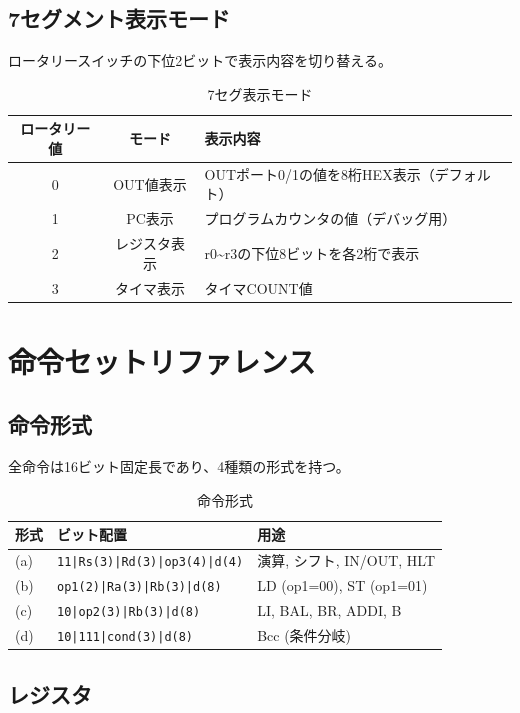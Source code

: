 \documentclass[a4paper,11pt]{ltjsarticle}
\begin{document}
\subsection{7セグメント表示モード}

ロータリースイッチの下位2ビットで表示内容を切り替える。

\begin{table}[h]
\centering
\caption{7セグ表示モード}
\begin{tabular}{ccl}
\toprule
ロータリー値 & モード & 表示内容 \\
\midrule
0 & OUT値表示 & OUTポート0/1の値を8桁HEX表示（デフォルト） \\
1 & PC表示   & プログラムカウンタの値（デバッグ用） \\
2 & レジスタ表示 & r0\textasciitilde r3の下位8ビットを各2桁で表示 \\
3 & タイマ表示 & タイマCOUNT値 \\
\bottomrule
\end{tabular}
\end{table}


\section{命令セットリファレンス}

\subsection{命令形式}

全命令は16ビット固定長であり、4種類の形式を持つ。

\begin{table}[h]
\centering
\caption{命令形式}
\begin{tabular}{llp{7cm}}
\toprule
形式 & ビット配置 & 用途 \\
\midrule
(a) & \texttt{11|Rs(3)|Rd(3)|op3(4)|d(4)} & 演算, シフト, IN/OUT, HLT \\
(b) & \texttt{op1(2)|Ra(3)|Rb(3)|d(8)} & LD (op1=00), ST (op1=01) \\
(c) & \texttt{10|op2(3)|Rb(3)|d(8)} & LI, BAL, BR, ADDI, B \\
(d) & \texttt{10|111|cond(3)|d(8)} & Bcc (条件分岐) \\
\bottomrule
\end{tabular}
\end{table}

\subsection{レジスタ}
\end{document}
